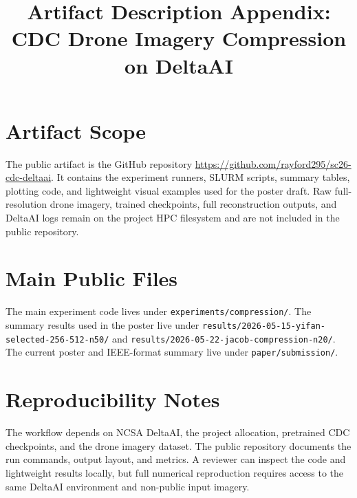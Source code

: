 \documentclass[conference]{IEEEtran}
\begin{document}
\title{Artifact Description Appendix: CDC Drone Imagery Compression on DeltaAI}
\author{}
\maketitle

\section{Artifact Scope}
The public artifact is the GitHub repository \url{https://github.com/rayford295/sc26-cdc-deltaai}. It contains the experiment runners, SLURM scripts, summary tables, plotting code, and lightweight visual examples used for the poster draft. Raw full-resolution drone imagery, trained checkpoints, full reconstruction outputs, and DeltaAI logs remain on the project HPC filesystem and are not included in the public repository.

\section{Main Public Files}
The main experiment code lives under \texttt{experiments/compression/}. The summary results used in the poster live under \texttt{results/2026-05-15-yifan-selected-256-512-n50/} and \texttt{results/2026-05-22-jacob-compression-n20/}. The current poster and IEEE-format summary live under \texttt{paper/submission/}.

\section{Reproducibility Notes}
The workflow depends on NCSA DeltaAI, the project allocation, pretrained CDC checkpoints, and the drone imagery dataset. The public repository documents the run commands, output layout, and metrics. A reviewer can inspect the code and lightweight results locally, but full numerical reproduction requires access to the same DeltaAI environment and non-public input imagery.
\end{document}
